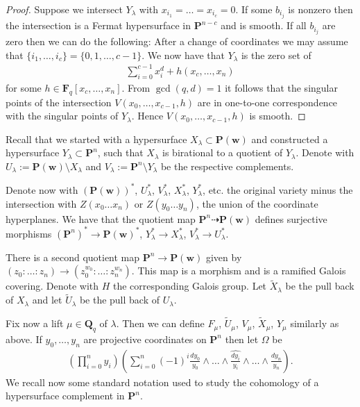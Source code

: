 \documentclass[11pt]{article}
\numberwithin{equation}{section}
\begin{document}
\begin{proof} Suppose we intersect $Y_{\lambda}$ with $x_{i_1}=\dots=x_{i_c}=0$. If some $b_{i_j}$ is nonzero then the inter\-section is a Fermat hypersurface in $\mathbf{P}^{n-c}$ and is smooth. If all $b_{i_j}$ are zero then we can do the following: After a change of coordinates we may assume that $\{i_1,\dots,i_{c}\}=\{0,1,\dots,c-1\}$. We now have that $Y_{\lambda}$ is the zero set of
\begin{gather*} \sum_{i=0}^{c-1} x_i^d+h(x_c,\dots,x_n)\end{gather*}
for some $h\in \mathbf{F}_q[x_c,\dots,x_n]$. From $\gcd(q,d)=1$ it follows that the singular points of the intersection $V(x_0,\dots,x_{c-1},h)$ are in one-to-one correspondence with the singular points of $Y_\lambda$. Hence $V(x_0,\dots,x_{c-1},h)$ is smooth.
\end{proof}

Recall that we started with a hypersurface $X_\lambda \subset \mathbf{P}(\mathbf{w})$ and constructed a hypersurface $Y_{\lambda}\subset \mathbf{P}^n$, such that $X_\lambda$ is birational to a quotient of $Y_\lambda$. Denote with $U_{\lambda}:=\mathbf{P}(\mathbf{w})\setminus X_\lambda$ and $V_{\lambda}:=\mathbf{P}^n\setminus Y_\lambda$ be the respective complements.

Denote now with $(\mathbf{P}(\mathbf{w}))^*$, $U_{\lambda}^*$, $V_{\lambda}^*$, $X_{\lambda}^*$, $Y_\lambda^*$, etc. the original variety minus the intersection with $Z(x_0\dots x_n)$ or $Z(y_0 \dots y_n)$, the union of the coordinate hyperplanes. We have that the quotient map $\mathbf{P}^n \dashrightarrow \mathbf{P}(\mathbf{w})$ def\/ines surjective morphisms $(\mathbf{P}^n)^*\to \mathbf{P}(\mathbf{w})^*$, $Y_\lambda^*\to X_{\lambda}^*$, $V_\lambda^*\to U_\lambda^*$.

There is a second quotient map $\mathbf{P}^n \to \mathbf{P}(\mathbf{w})$ given by $(z_0:\dots:z_n) \to (z_0^{w_0}:\dots:z_n^{w_n})$. This map is a morphism and is a ramif\/ied Galois covering. Denote with $H$ the corresponding Galois group. Let $\tilde{X}_{\lambda}$ be the pull back of $X_\lambda$ and let $\tilde{U}_{\lambda}$ be the pull back of $U_{\lambda}$.

Fix now a lift $\mu\in \mathbf{Q}_q$ of $\lambda$. Then we can def\/ine $F_{\mu}$, $\tilde{U}_{\mu}$, $V_{\mu}$, $\tilde{ X}_{\mu}$, $Y_{\mu}$ similarly as above. If $y_0,\dots,y_n$ are projective coordinates on $\mathbf{P}^n$ then let $\Omega$ be
\begin{gather*} \left(\prod_{i=0}^n y_i\right) \left(\sum_{i=0}^n (-1)^{i} \frac{dy_0}{y_0} \wedge \dots \wedge \widehat{\frac{dy_i}{y_i} }\wedge\dots \wedge\frac{dy_n}{y_n} \right).\end{gather*}
We recall now some standard notation used to study the cohomology of a hypersurface complement in $\mathbf{P}^n$.
\end{document}
